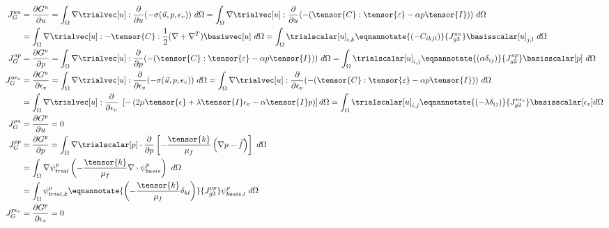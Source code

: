 \begin{align}
J_G^{uu} &= \frac{\partial G^u}{\partial u} = \int_{\Omega} \nabla \trialvec[u] : \frac{\partial}{\partial u} (- \sigma(\vec{u},p,\epsilon_{v})) \
d\Omega = \int_{\Omega} \nabla \trialvec[u] : \frac{\partial}{\partial u} (-(\tensor{C}:\tensor{\varepsilon} -\alpha p \tensor{I})) \ d\Omega \\
&= \int_{\Omega} \nabla \trialvec[u] : -\tensor{C}: \frac{1}{2} (\nabla + \nabla^T) \basisvec[u] \ d\Omega = \int_{\Omega} \trialscalar[u]_{i,k}
\eqnannotate{\left(-C_{ikjl}\right)}{J_{g3}^{uu}} \basisscalar[u]_{j,l} \ d\Omega
\\
%
J_G^{up} &= \frac{\partial G^u}{\partial p} = \int_{\Omega} \nabla \trialvec[u] : \frac{\partial}{\partial p}(-(\tensor{C}:\tensor{\varepsilon} -\alpha p \tensor{I})) \ d\Omega =
\int_{\Omega} \trialscalar[u]_{i,j} \eqnannotate{\left(\alpha \delta_{ij}\right)}{J_{g2}^{up}} \basisscalar[p] \ d\Omega \\
%
J_G^{u\epsilon_{v}} &= \frac{\partial G^u}{\partial \epsilon_{v}} = \int_{\Omega} \nabla \trialvec[u] : \frac{\partial}{\partial \epsilon_{v}}
(-\sigma(\vec{u},p,\epsilon_{v})) \ d\Omega = \int_{\Omega} \nabla \trialvec[u] :
\frac{\partial}{\partial \epsilon_{v}} (-(\tensor{C}:\tensor{\varepsilon} -\alpha p \tensor{I})) \ d\Omega \\
&= \int_{\Omega} \nabla \trialvec[u] : \frac{\partial}{\partial \epsilon_{v}} \
\left[-\left(2 \mu \tensor{\epsilon} + \lambda \tensor{I} \epsilon_{v} - \alpha \tensor{I} p \right) \right] d\Omega =
\int_{\Omega} \trialscalar[u]_{i,j} \eqnannotate{\left(-\lambda \delta_{ij} \right)}{J_{g2}^{u \epsilon_{v}}} \basisscalar[\epsilon_{v}] d\Omega  \\
%
J_G^{pu} &= \frac{\partial G^p}{\partial u} = 0 \\
%
J_G^{pp} &= \frac{\partial G^p}{\partial p} = \int_{\Omega} \nabla
\trialscalar[p] \cdot \frac{\partial}{\partial p} \left[-\frac{\tensor{k}}{\mu_{f}} \left(\nabla p -
\vec{f} \right) \right] \ d\Omega \\
&= \int_{\Omega} \nabla \psi_{trial}^ p \left(-\frac{\tensor{k}}{\mu_{f}}
\nabla \cdot \psi_{basis}^p \right) \ d\Omega \\
&= \int_{\Omega} \psi_{trial,k}^p \eqnannotate{\left(-\frac{\tensor{k}}{\mu_{f}}
\delta_{kl}\right)}{J_{g3}^{pp}}
\psi_{basis,l}^p \ d\Omega \\
%
J_G^{p\epsilon_{v}} &= \frac{\partial G^p}{\partial \epsilon_{v}} = 0 \\

\end{align}
